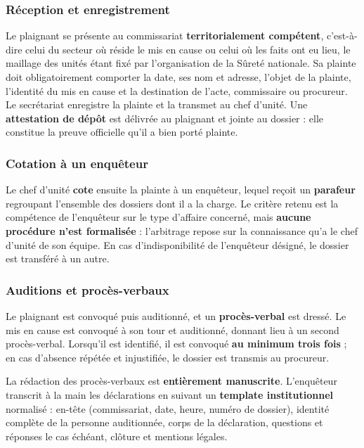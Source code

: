 \subsubsection*{Réception et enregistrement}

Le plaignant se présente au commissariat \textbf{territorialement compétent}, c'est-à-dire celui du secteur où réside le mis en cause ou celui où les faits ont eu lieu, le maillage des unités étant fixé par l'organisation de la Sûreté nationale. Sa plainte doit obligatoirement comporter la date, ses nom et adresse, l'objet de la plainte, l'identité du mis en cause et la destination de l'acte, commissaire ou procureur. Le secrétariat enregistre la plainte et la transmet au chef d'unité. Une \textbf{attestation de dépôt} est délivrée au plaignant et jointe au dossier : elle constitue la preuve officielle qu'il a bien porté plainte.

\subsubsection*{Cotation à un enquêteur}

Le chef d'unité \textbf{cote} ensuite la plainte à un enquêteur, lequel reçoit un \textbf{parafeur} regroupant l'ensemble des dossiers dont il a la charge. Le critère retenu est la compétence de l'enquêteur sur le type d'affaire concerné, mais \textbf{aucune procédure n'est formalisée} : l'arbitrage repose sur la connaissance qu'a le chef d'unité de son équipe. En cas d'indisponibilité de l'enquêteur désigné, le dossier est transféré à un autre.

\subsubsection*{Auditions et procès-verbaux}

Le plaignant est convoqué puis auditionné, et un \textbf{procès-verbal} est dressé. Le mis en cause est convoqué à son tour et auditionné, donnant lieu à un second procès-verbal. Lorsqu'il est identifié, il est convoqué \textbf{au minimum trois fois} ; en cas d'absence répétée et injustifiée, le dossier est transmis au procureur.

La rédaction des procès-verbaux est \textbf{entièrement manuscrite}. L'enquêteur transcrit à la main les déclarations en suivant un \textbf{template institutionnel} normalisé : en-tête (commissariat, date, heure, numéro de dossier), identité complète de la personne auditionnée, corps de la déclaration, questions et réponses le cas échéant, clôture et mentions légales.

